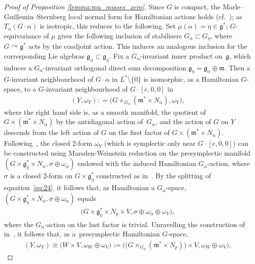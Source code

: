 \documentclass[pdftex]{sigma}
\numberwithin{equation}{section}
\newcommand{\CM}{(M,H)} %
\newcommand{\SYM}{L^* \setminus \{0\}} %
\begin{document}
\begin{proof}[Proof of Proposition \ref{lemma:mu_misses_zero}]
Since $G$ is compact, the Marle--Guillemin--Sternberg local normal form for Hamiltonian actions holds (cf.~\cite{guillemin_sternberg,marle_ham}); as $T_{\alpha} ( G \cdot \alpha )$ is isotropic, this reduces to the following. Set $\mu(\alpha) = \eta \in \mathfrak{g}^*$; $G$-equivariance of $\mu$ gives the following inclusion of stabilisers $G_{\alpha} \subset G_{\eta}$, where $G \curvearrowright \mathfrak{g}^*$ acts by the coadjoint action. This induces an analogous inclusion for the corresponding Lie algebras $\mathfrak{g}_{\alpha} \subset \mathfrak{g}_{\eta}$. Fix a $G_{\alpha}$-invariant inner product on~$\mathfrak{g}$, which induces a $G_{\alpha}$-invariant orthogonal direct sum decomposition $\mathfrak{g}_{\eta} = \mathfrak{g}_{\alpha} \oplus \mathfrak{m}$. Then a $G$-invariant neighbourhood of $G\cdot \alpha$ in $\SYM$ is isomorphic, as a Hamiltonian $G$-space, to a $G$-invariant neighbourhood of $G \cdot [e,0,0]$ in
 \begin{gather*}
(Y,\omega_Y) : = \big(G \times_{G_{\alpha}} (\mathfrak{m}^* \times N_{\alpha}), \omega_Y \big),
 \end{gather*}
where the right hand side is, as a smooth manifold, the quotient of $G \times ( \mathfrak{m}^* \times N_{\alpha})$ by the antidiagonal action of~$G_{\alpha}$, and the action of $G$ on $Y$ descends from the left action of $G$ on the f\/irst factor of $G \times (\mathfrak{m}^* \times N_{\alpha})$. Following~\cite{ortega_ratiu,sl}, the closed 2-form $\omega_Y$ (which is symplectic only near $G \cdot [e,0,0]$) can be constructed using Marsden-Weinstein reduction on the presymplectic manifold $(G \times \mathfrak{g}^*_{\eta} \times N_{\alpha}, \sigma \oplus \omega_{\alpha})$ endowed with the induced
 Hamiltonian $G_{\alpha}$-action, where $\sigma$ is a closed 2-form on $G \times \mathfrak{g}^*_{\eta}$ constructed as in~\cite{ortega_ratiu}. By the splitting of equation~\eqref{eq:24}, it follows that, as Hamiltonian a $G_{\alpha}$-space, $(G \times \mathfrak{g}^*_{\eta} \times N_{\alpha}, \sigma \oplus \omega_{\alpha})$ equals
 \begin{gather*}
 \big(G \times \mathfrak{g}^*_{\eta} \times N_{p} \times V, \sigma \oplus \omega_{\alpha} \oplus \omega_V \big),
 \end{gather*}
 where the $G_{\alpha}$-action on the last factor is trivial. Unravelling the construction of in~\cite{ortega_ratiu,sl}, it follows that, as a~presymplectic
 Hamiltonian $G$-space,
 \begin{gather*}
 (Y,\omega_Y) \cong \big(W \times V, \omega_W \oplus \omega_V\big):=\big(\big(G \times_{G_{\alpha}} (\mathfrak{m}^* \times N_{p} )\big) \times V, \omega_W \oplus \omega_V \big),

\end{gather*}
\end{proof}
\end{document}
